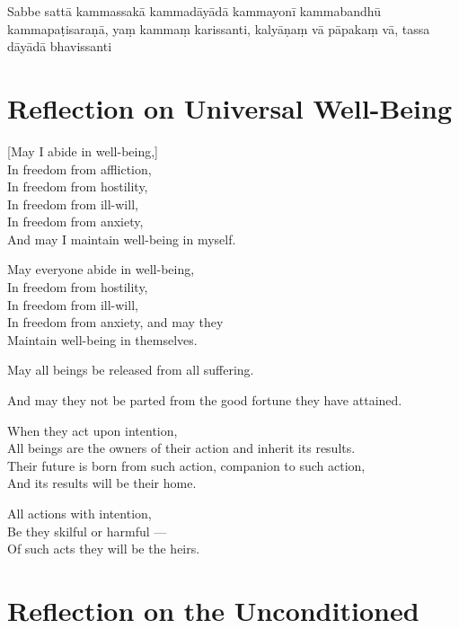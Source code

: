 Sabbe sattā kammassakā kammadāyādā kammayonī kammabandhū kammapaṭisaraṇā,
yaṃ kammaṃ karissanti, kalyāṇaṃ vā pāpakaṃ vā, tassa dāyādā bhavissanti


\section{Reflection on Universal Well-Being}

\begin{leader}
\end{leader}


[May I abide in well-being,]\\
In freedom from affliction,\\
In freedom from hostility,\\
In freedom from ill-will,\\
In freedom from anxiety,\\
And may I maintain well-being in myself.

May everyone abide in well-being,\\
In freedom from hostility,\\
In freedom from ill-will,\\
In freedom from anxiety, and may they\\
Maintain well-being in themselves.

May all beings be released from all suffering.

And may they not be parted from the good fortune they have attained.

When they act upon intention,\\
All beings are the owners of their action and inherit its results.\\
Their future is born from such action, companion to such action,\\
And its results will be their home.

All actions with intention,\\
Be they skilful or harmful ---\\
Of such acts they will be the heirs.


\section[The Unconditioned]{Reflection on the Unconditioned}

